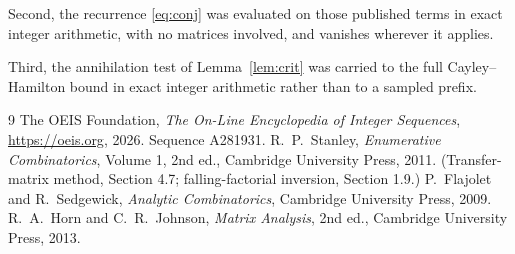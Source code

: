 \documentclass[11pt,a4paper]{article}
\theoremstyle{plain}
\theoremstyle{definition}
\begin{document}
Second, the recurrence \eqref{eq:conj} was evaluated on those published terms in exact
integer arithmetic, with no matrices involved, and vanishes wherever it applies.

Third, the annihilation test of Lemma~\ref{lem:crit} was carried to the full
Cayley--Hamilton bound in exact integer arithmetic rather than to a sampled prefix.

\begin{thebibliography}{9}
 The OEIS Foundation, \emph{The On-Line Encyclopedia of Integer
Sequences}, \url{https://oeis.org}, 2026. Sequence A281931.
 R.~P.~Stanley, \emph{Enumerative Combinatorics}, Volume 1, 2nd ed.,
Cambridge University Press, 2011. (Transfer-matrix method, Section 4.7; falling-factorial
inversion, Section 1.9.)
 P.~Flajolet and R.~Sedgewick, \emph{Analytic Combinatorics}, Cambridge
University Press, 2009.
 R.~A.~Horn and C.~R.~Johnson, \emph{Matrix Analysis}, 2nd ed., Cambridge
University Press, 2013.
\end{thebibliography}
\end{document}
